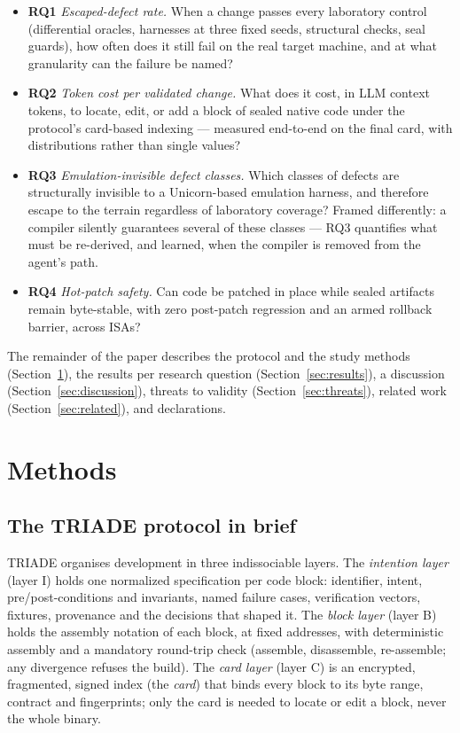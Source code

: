 \documentclass[10pt,a4paper]{article}
\newcommand{\RQ}[1]{\textbf{RQ#1}}
\begin{document}
\begin{itemize}
\item \RQ{1} \emph{Escaped-defect rate.} When a change passes every
laboratory control (differential oracles, harnesses at three fixed seeds,
structural checks, seal guards), how often does it still fail on the real
target machine, and at what granularity can the failure be named?
\item \RQ{2} \emph{Token cost per validated change.} What does it cost,
in LLM context tokens, to locate, edit, or add a block of sealed native
code under the protocol's card-based indexing --- measured end-to-end
on the final card, with distributions rather than single values?
\item \RQ{3} \emph{Emulation-invisible defect classes.} Which classes of
defects are structurally invisible to a Unicorn-based emulation harness,
and therefore escape to the terrain regardless of laboratory coverage?
Framed differently: a compiler silently guarantees several of these
classes --- RQ3 quantifies what must be re-derived, and learned, when the
compiler is removed from the agent's path.
\item \RQ{4} \emph{Hot-patch safety.} Can code be patched in place while
sealed artifacts remain byte-stable, with zero post-patch regression and
an armed rollback barrier, across ISAs?
\end{itemize}

The remainder of the paper describes the protocol and the study methods
(Section~\ref{sec:methods}), the results per research question
(Section~\ref{sec:results}), a discussion (Section~\ref{sec:discussion}),
threats to validity (Section~\ref{sec:threats}), related work
(Section~\ref{sec:related}), and declarations.

\section{Methods}\label{sec:methods}

\subsection{The TRIADE protocol in brief}\label{sec:protocole}

TRIADE organises development in three indissociable layers. The
\emph{intention layer} (layer I) holds one normalized specification per
code block: identifier, intent, pre/post-conditions and invariants, named
failure cases, verification vectors, fixtures, provenance and the
decisions that shaped it. The \emph{block layer} (layer B) holds the
assembly notation of each block, at fixed addresses, with deterministic
assembly and a mandatory round-trip check (assemble, disassemble,
re-assemble; any divergence refuses the build). The \emph{card layer}
(layer C) is an encrypted, fragmented, signed index (the \emph{card}) that
binds every block to its byte range, contract and fingerprints; only the
card is needed to locate or edit a block, never the whole binary.
\end{document}

